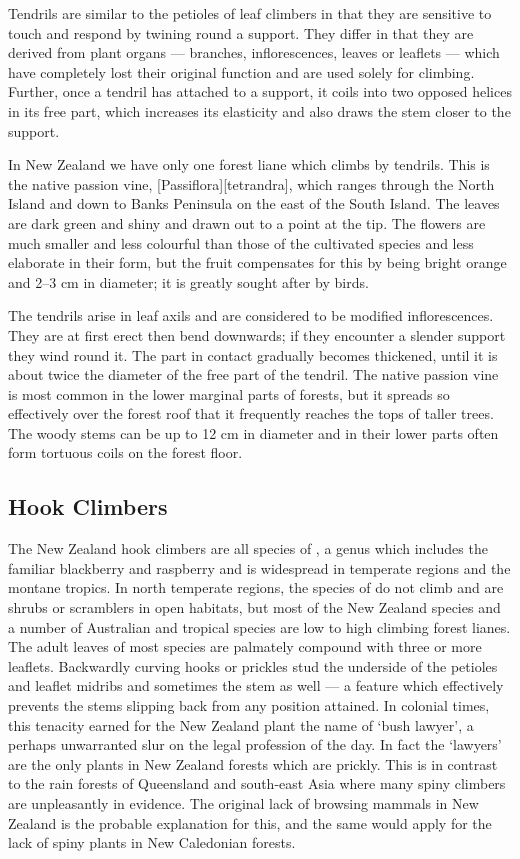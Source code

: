 Tendrils are similar to the petioles of leaf climbers in that they are sensitive to touch and respond by twining round a support.
They differ in that they are derived from plant organs --- branches, inflorescences, leaves or leaflets --- which have completely lost their original function and are used solely for climbing.
Further, once a tendril has attached to a support, it coils into two opposed helices in its free part, which increases its elasticity and also draws the stem closer to the support.

In New Zealand we have only one forest liane which climbs by tendrils.
This is the native passion vine, [Passiflora][tetrandra], which ranges through the North Island and down to Banks Peninsula on the east of the South Island.
The leaves are dark green and shiny and drawn out to a point at the tip.
The flowers are much smaller and less colourful than those of the cultivated species and less elaborate in their form, but the fruit compensates for this by being bright orange and 2--3 cm in diameter; it is greatly sought after by birds.

The tendrils arise in leaf axils and are considered to be modified inflorescences.
They are at first erect then bend downwards; if they encounter a slender support they wind round it.
The part in contact gradually becomes thickened, until it is about twice the diameter of the free part of the tendril.
The native passion vine is most common in the lower marginal parts of forests, but it spreads so effectively over the forest roof that it frequently reaches the tops of taller trees.
The woody stems can be up to 12 cm in diameter and in their lower parts often form tortuous coils on the forest floor.

\subsection{Hook Climbers}

The New Zealand hook climbers are all species of , a genus which includes the familiar blackberry and raspberry and is widespread in temperate regions and the montane tropics.
In north temperate regions, the species of  do not climb and are shrubs or scramblers in open habitats, but most of the New Zealand species and a number of Australian and tropical species are low to high climbing forest lianes.
The adult leaves of most species are palmately compound with three or more leaflets.
Backwardly curving hooks or prickles stud the underside of the petioles and leaflet midribs and sometimes the stem as well --- a feature which effectively prevents the stems slipping back from any position attained.
In colonial times, this tenacity earned for the New Zealand plant the name of `bush lawyer', a perhaps unwarranted slur on the legal profession of the day.
In fact the `lawyers' are the only plants in New Zealand forests which are prickly.
This is in contrast to the rain forests of Queensland and south-east Asia where many spiny climbers are unpleasantly in evidence.
The original lack of browsing mammals in New Zealand is the probable explanation for this, and the same would apply for the lack of spiny plants in New Caledonian forests.

